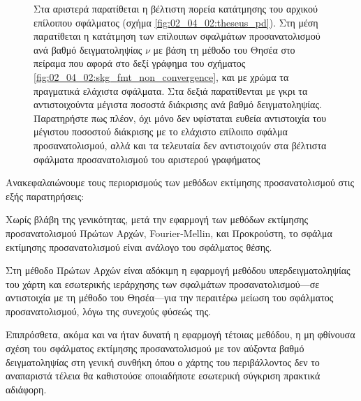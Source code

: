 \begin{figure}[!h]
\begin{subfigure}{0.33\linewidth}
\begin{onion}{0.7cm}
    \end{onion}
  \end{subfigure}
\vspace{-1cm}
\caption{\small Στα αριστερά παρατίθεται η βέλτιστη πορεία κατάτμησης του
         αρχικού επίλοιπου σφάλματος (σχήμα \ref{fig:02_04_02:theseus_pd}). Στη
         μέση παρατίθεται η κατάτμηση των επίλοιπων σφαλμάτων προσανατολισμού
         ανά βαθμό δειγματοληψίας $\nu$ με βάση τη μέθοδο του Θησέα στο πείραμα
         που αφορά στο δεξί γράφημα του σχήματος
         \ref{fig:02_04_02:skg_fmt_non_convergence}, και με χρώμα τα πραγματικά
         ελάχιστα σφάλματα. Στα δεξιά παρατίθενται με γκρι τα αντιστοιχούντα
         μέγιστα ποσοστά διάκρισης ανά βαθμό δειγματοληψίας. Παρατηρήστε πως
         πλέον, όχι μόνο δεν υφίσταται ευθεία αντιστοιχία του μέγιστου ποσοστού
         διάκρισης με το ελάχιστο επίλοιπο σφάλμα προσανατολισμού, αλλά και τα
         τελευταία δεν αντιστοιχούν στα βέλτιστα σφάλματα προσανατολισμού του
         αριστερού γραφήματος}
\label{fig:02_04_02:theseus_false_pd}
\end{figure}

\vspace{0.4cm}

Ανακεφαλαιώνουμε τους περιορισμούς των μεθόδων εκτίμησης προσανατολισμού στις
εξής παρατηρήσεις:

\begin{remark}
  \label{remark:02_04_02:01}
  Χωρίς βλάβη της γενικότητας, μετά την εφαρμογή των μεθόδων εκτίμησης
  προσανατολισμού Πρώτων Αρχών, Fourier-Mellin, και Προκρούστη, το σφάλμα
  εκτίμησης προσανατολισμού είναι ανάλογο του σφάλματος θέσης.
\end{remark}

\begin{remark}
  \label{remark:02_04_02:02}
  Στη μέθοδο Πρώτων Αρχών είναι αδόκιμη η εφαρμογή μεθόδου υπερδειγματοληψίας
  του χάρτη και εσωτερικής ιεράρχησης των σφαλμάτων προσανατολισμού---σε
  αντιστοιχία με τη μέθοδο του Θησέα---για την περαιτέρω μείωση του σφάλματος
  προσανατολισμού, λόγω της συνεχούς φύσεώς της.
\end{remark}

\begin{remark}
  \label{remark:02_04_02:03}
  Επιπρόσθετα, ακόμα και να ήταν δυνατή η εφαρμογή τέτοιας μεθόδου, η μη
  φθίνουσα σχέση του σφάλματος εκτίμησης προσανατολισμού με τον αύξοντα βαθμό
  δειγματοληψίας στη γενική συνθήκη όπου ο χάρτης του περιβάλλοντος δεν το
  αναπαριστά τέλεια θα καθιστούσε οποιαδήποτε εσωτερική σύγκριση πρακτικά
  αδιάφορη.
\end{remark}


